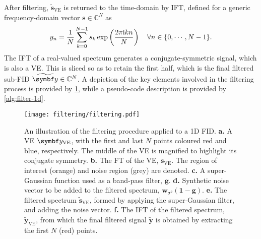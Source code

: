 After filtering, $\widetilde{\symbf{s}}_{\text{VE}}$ is returned to the
time-domain by \ac{IFT}, defined for a generic frequency-domain vector $\symbf{s} \in \mathbb{C}^N$ as
\begin{equation}
    y_n = \frac{1}{N} \sum_{k=0}^{N-1} s_k
        \exp\left(\frac{2 \pi \mathrm{i} k n}{N}\right)
        \quad \forall n \in \lbrace 0, \cdots, N-1 \rbrace.
\end{equation}
The \ac{IFT} of a real-valued spectrum generates a
conjugate-symmetric signal, which is also a \ac{VE}. This is sliced so as to
retain the first half, which is the final filtered sub-FID $\widetilde{\by} \in
\mathbb{C}^{N}$.
A depiction of the key elements involved in the filtering process is provided
by \cref{fig:filtering}, while a pseudo-code description is provided by
\cref{alg:filter-1d}.
\begin{figure}
     \centering
     \texttt{[image: filtering/filtering.pdf]}
     \caption[
         An illustration of the filtering procedure applied to a \acs{1D}
         \acs{FID}.
     ]{
         An illustration of the filtering procedure applied to a \ac{1D}
         \ac{FID}.
         \textbf{a.} A \ac{VE} $\by_{\text{VE}}$, with the first and last
         $N$ points coloured red and blue, respectively. The middle of the
         \ac{VE} is magnified to highlight its conjugate symmetry.
         \textbf{b.} The \ac{FT} of the \ac{VE}, $\symbf{s}_{\text{VE}}$.
         The region of interest (orange) and noise region (grey) are denoted.
         \textbf{c.} A super-Gaussian function used as a band-pass filter,
         $\symbf{g}$.
         \textbf{d.} Synthetic noise vector to be added to the filtered
         spectrum, $\symbf{w}_{\sigma^2} (\symbf{1} - \symbf{g})$.
         \textbf{e.} The filtered spectrum $\widetilde{\symbf{s}}_{\text{VE}}$,
         formed by applying the super-Gaussian filter, and adding the noise
         vector.
         \textbf{f.} The \ac{IFT} of the filtered spectrum,
         $\widetilde{\symbf{y}}_{\text{VE}}$, from which the final filtered
         signal $\widetilde{\symbf{y}}$ is obtained by extracting
         the first $N$ (red) points.
     }
     \label{fig:filtering}
\end{figure}


